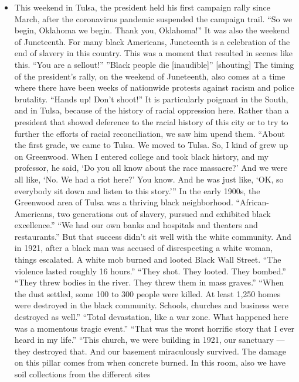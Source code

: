 \begin{itemize}
\tightlist
\item
  This weekend in Tulsa, the president held his first campaign rally
  since March, after the coronavirus pandemic suspended the campaign
  trail. ``So we begin, Oklahoma we begin. Thank you, Oklahoma!'' It was
  also the weekend of Juneteenth. For many black Americans, Juneteenth
  is a celebration of the end of slavery in this country. This was a
  moment that resulted in scenes like this. ``You are a sellout!''
  ''Black people die {[}inaudible{]}'' {[}shouting{]} The timing of the
  president's rally, on the weekend of Juneteenth, also comes at a time
  where there have been weeks of nationwide protests against racism and
  police brutality. ``Hands up! Don't shoot!'' It is particularly
  poignant in the South, and in Tulsa, because of the history of racial
  oppression here. Rather than a president that showed deference to the
  racial history of this city or to try to further the efforts of racial
  reconciliation, we saw him upend them. ``About the first grade, we
  came to Tulsa. We moved to Tulsa. So, I kind of grew up on Greenwood.
  When I entered college and took black history, and my professor, he
  said, `Do you all know about the race massacre?' And we were all like,
  `No. We had a riot here?' You know. And he was just like, `OK, so
  everybody sit down and listen to this story.''' In the early 1900s,
  the Greenwood area of Tulsa was a thriving black neighborhood.
  ``African-Americans, two generations out of slavery, pursued and
  exhibited black excellence.'' ``We had our own banks and hospitals and
  theaters and restaurants.'' But that success didn't sit well with the
  white community. And in 1921, after a black man was accused of
  disrespecting a white woman, things escalated. A white mob burned and
  looted Black Wall Street. ``The violence lasted roughly 16 hours.''
  ``They shot. They looted. They bombed.'' ``They threw bodies in the
  river. They threw them in mass graves.'' ``When the dust settled, some
  100 to 300 people were killed. At least 1,250 homes were destroyed in
  the black community. Schools, churches and business were destroyed as
  well.'' ``Total devastation, like a war zone. What happened here was a
  momentous tragic event.'' ``That was the worst horrific story that I
  ever heard in my life.'' ``This church, we were building in 1921, our
  sanctuary --- they destroyed that. And our basement miraculously
  survived. The damage on this pillar comes from when concrete burned.
  In this room, also we have soil collections from the different sites

\end{itemize}
